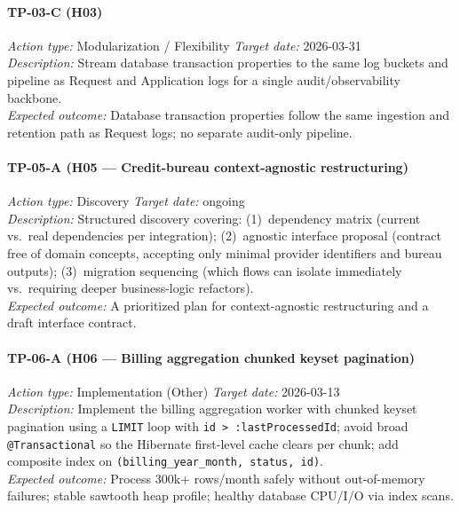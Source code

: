 \paragraph{TP-03-C \textnormal{(H03)}}
\textit{Action type:} Modularization / Flexibility \quad \textit{Target date:} 2026-03-31 \\
\textit{Description:} Stream database transaction properties to the same log
buckets and pipeline as Request and Application logs for a single
audit/observability backbone. \\
\textit{Expected outcome:} Database transaction properties follow the same
ingestion and retention path as Request logs; no separate audit-only pipeline.

\paragraph{TP-05-A \textnormal{(H05 — Credit-bureau context-agnostic restructuring)}}
\textit{Action type:} Discovery \quad \textit{Target date:} ongoing \\
\textit{Description:} Structured discovery covering: (1)~dependency matrix
(current vs.\ real dependencies per integration); (2)~agnostic interface
proposal (contract free of domain concepts, accepting only minimal provider
identifiers and bureau outputs); (3)~migration sequencing (which flows can
isolate immediately vs.\ requiring deeper business-logic refactors). \\
\textit{Expected outcome:} A prioritized plan for context-agnostic restructuring and a
draft interface contract.

\paragraph{TP-06-A \textnormal{(H06 — Billing aggregation chunked keyset pagination)}}
\textit{Action type:} Implementation (Other) \quad \textit{Target date:} 2026-03-13 \\
\textit{Description:} Implement the billing aggregation worker with chunked
keyset pagination using a \texttt{LIMIT} loop with
\texttt{id > :lastProcessedId}; avoid broad \texttt{@Transactional} so the
Hibernate first-level cache clears per chunk; add composite index on
\texttt{(billing\_year\_month, status, id)}. \\
\textit{Expected outcome:} Process 300k+ rows/month safely without
out-of-memory failures; stable sawtooth heap profile; healthy database
CPU/I/O via index scans.

